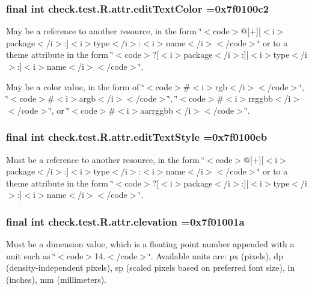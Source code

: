 \subsubsection[{edit\+Text\+Color}]{\setlength{\rightskip}{0pt plus 5cm}final int check.\+test.\+R.\+attr.\+edit\+Text\+Color =0x7f0100c2\hspace{0.3cm}{\ttfamily [static]}}\label{classcheck_1_1test_1_1_r_1_1attr_aad21217d13320c22507aeaf702f94f11}
May be a reference to another resource, in the form \char`\"{}$<$code$>$@\mbox{[}+\mbox{]}\mbox{[}$<$i$>$package$<$/i$>$\+:\mbox{]}$<$i$>$type$<$/i$>$\+:$<$i$>$name$<$/i$>$$<$/code$>$\char`\"{} or to a theme attribute in the form \char`\"{}$<$code$>$?\mbox{[}$<$i$>$package$<$/i$>$\+:\mbox{]}\mbox{[}$<$i$>$type$<$/i$>$\+:\mbox{]}$<$i$>$name$<$/i$>$$<$/code$>$\char`\"{}. 

May be a color value, in the form of \char`\"{}$<$code$>$\#$<$i$>$rgb$<$/i$>$$<$/code$>$\char`\"{}, \char`\"{}$<$code$>$\#$<$i$>$argb$<$/i$>$$<$/code$>$\char`\"{}, \char`\"{}$<$code$>$\#$<$i$>$rrggbb$<$/i$>$$<$/code$>$\char`\"{}, or \char`\"{}$<$code$>$\#$<$i$>$aarrggbb$<$/i$>$$<$/code$>$\char`\"{}. \hypertarget{classcheck_1_1test_1_1_r_1_1attr_ac6e9f356d0779026955b5bcf35036f7f}{}
\subsubsection[{edit\+Text\+Style}]{\setlength{\rightskip}{0pt plus 5cm}final int check.\+test.\+R.\+attr.\+edit\+Text\+Style =0x7f0100eb\hspace{0.3cm}{\ttfamily [static]}}\label{classcheck_1_1test_1_1_r_1_1attr_ac6e9f356d0779026955b5bcf35036f7f}
Must be a reference to another resource, in the form \char`\"{}$<$code$>$@\mbox{[}+\mbox{]}\mbox{[}$<$i$>$package$<$/i$>$\+:\mbox{]}$<$i$>$type$<$/i$>$\+:$<$i$>$name$<$/i$>$$<$/code$>$\char`\"{} or to a theme attribute in the form \char`\"{}$<$code$>$?\mbox{[}$<$i$>$package$<$/i$>$\+:\mbox{]}\mbox{[}$<$i$>$type$<$/i$>$\+:\mbox{]}$<$i$>$name$<$/i$>$$<$/code$>$\char`\"{}. \hypertarget{classcheck_1_1test_1_1_r_1_1attr_acf20b055f3e563dc5c426990bf2b3b7e}{}
\subsubsection[{elevation}]{\setlength{\rightskip}{0pt plus 5cm}final int check.\+test.\+R.\+attr.\+elevation =0x7f01001a\hspace{0.3cm}{\ttfamily [static]}}\label{classcheck_1_1test_1_1_r_1_1attr_acf20b055f3e563dc5c426990bf2b3b7e}
Must be a dimension value, which is a floating point number appended with a unit such as \char`\"{}$<$code$>$14.\+5sp$<$/code$>$\char`\"{}. Available units are\+: px (pixels), dp (density-\/independent pixels), sp (scaled pixels based on preferred font size), in (inches), mm (millimeters). 

